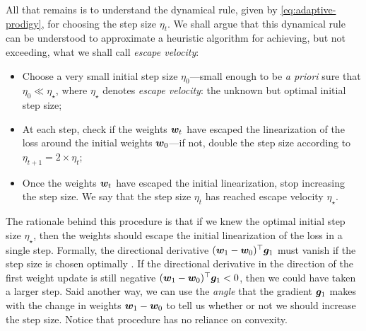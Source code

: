 All that remains is to understand the dynamical rule, given by \cref{eq:adaptive-prodigy}, for choosing the step size $\eta_t$. We shall argue that this dynamical rule can be understood to approximate a heuristic algorithm for achieving, but not exceeding, what we shall call \textit{escape velocity}:
\begin{itemize}
    \item Choose a very small initial step size $\eta_0$---small enough to be \textit{a priori} sure that $\eta_0 \ll \eta_\star$, where $\eta_\star$ denotes \textit{escape velocity}: the unknown but optimal initial step size;
    \item At each step, check if the weights ${\bm{w}}_t$ have escaped the linearization of the loss around the initial weights ${\bm{w}}_0$---if not, double the step size according to $\eta_{t+1} = 2 \times \eta_t$;
    \item Once the weights ${\bm{w}}_t$ have escaped the initial linearization, stop increasing the step size. We say that the step size $\eta_t$ has reached escape velocity $\eta_\star$.
\end{itemize}
The rationale behind this procedure is that if we knew the optimal initial step size $\eta_\star$, then the weights should escape the initial linearization of the loss in a single step. Formally, the directional derivative $({\bm{w}}_1 - {\bm{w}}_0)^\top {\bm{g}}_1$ must vanish if the step size is chosen optimally \citep{cauchy1847methode}. If the directional derivative in the direction of the first weight update is still negative $({\bm{w}}_1 - {\bm{w}}_0)^\top {\bm{g}}_1 < 0$, then we could have taken a larger step. Said another way, we can use the \textit{angle} that the gradient ${\bm{g}}_1$ makes with the change in weights ${\bm{w}}_1 - {\bm{w}}_0$ to tell us whether or not we should increase the step size. Notice that procedure has no reliance on convexity. 

